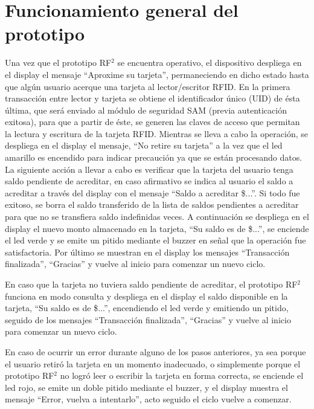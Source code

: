 \section{Funcionamiento general del prototipo}
Una vez que el prototipo RF$^{2}$ se encuentra operativo, el dispositivo despliega en el display el mensaje “Aproxime su tarjeta”, permaneciendo en dicho estado hasta que algún usuario acerque una tarjeta al lector/escritor RFID. 
En la primera transacción entre lector y tarjeta se obtiene el identificador único (UID) de ésta última, que será enviado al módulo de seguridad SAM (previa autenticación exitosa), para que a partir de éste, se generen las claves de acceso que permitan la lectura y escritura de la tarjeta RFID.
Mientras se lleva a cabo la operación, se despliega en el display el mensaje, “No retire su tarjeta” a la vez que el led amarillo es encendido para indicar precaución ya que se están procesando datos.
La siguiente acción a llevar a cabo es verificar que la tarjeta del usuario tenga saldo pendiente de acreditar, en caso afirmativo se indica al usuario el saldo a acreditar a través del display con el mensaje “Saldo a acreditar \$...”. Si todo fue exitoso, se borra el saldo transferido de la lista de saldos pendientes a acreditar para que no se transfiera saldo indefinidas veces.
A continuación se despliega en el display el nuevo monto almacenado en la tarjeta, “Su saldo es de \$...”, se enciende el led verde y se emite un pitido mediante el buzzer en señal que la operación fue satisfactoria.
Por último se muestran en el display los mensajes “Transacción finalizada”, “Gracias” y vuelve al inicio para comenzar un nuevo ciclo.

En caso que la tarjeta no tuviera saldo pendiente de acreditar, el prototipo RF$^{2}$ funciona en modo consulta y despliega en el display el saldo disponible en la tarjeta, “Su saldo es de \$...”, encendiendo el led verde y emitiendo un pitido, seguido de los mensajes “Transacción finalizada”, “Gracias” y vuelve al inicio para comenzar un nuevo ciclo.

En caso de ocurrir un error durante alguno de los pasos anteriores, ya sea porque
el usuario retiró la tarjeta en un momento inadecuado, o simplemente porque el prototipo RF$^{2}$
no logró leer o escribir la tarjeta en forma correcta, se enciende el led rojo, se emite un
doble pitido mediante el buzzer, y el display muestra el mensaje “Error, vuelva a intentarlo”,
acto seguido el ciclo vuelve a comenzar. 

